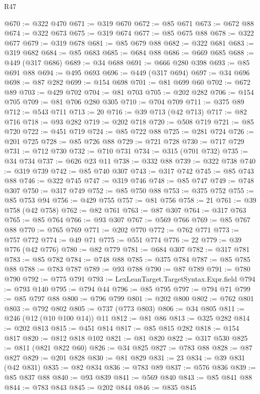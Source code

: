 \begin{lexlean}{R47}
\begin{coremodule}
@670 := @322 @470
@671 := @319 @670
@672 := @85 @671
@673 := @672 @88
@674 := @322 @673
@675 := @319 @674
@677 := @85 @675 @88
@678 := @322 @677
@679 := @319 @678
@681 := @85 @679 @88
@682 := @322 @681
@683 := @319 @682
@684 := @85 @683
@685 := @684 @88
@686 := @669 @685
@688 := @449 (@317 @686)
@689 := @34 @688
@691 := @666 @280 @398
@693 := @85 @691 @88
@694 := @495 @693
@696 := @449 (@317 @694)
@697 := @34 @696
@698 := @87 @282
@699 := @154 @698
@701 := @81 @699 @60
@702 := @672 @89
@703 := @429 @702
@704 := @81 @703
@705 := @202 @282
@706 := @154 @705
@709 := @81 @706 @280 @305
@710 := @704 @709
@711 := @375 @89
@712 := @543 @711
@713 := 20
@716 := @39 @713 (@42 @713)
@717 := @82 @716
@718 := @93 @282
@719 := @202 @718
@720 := @508 @719
@721 := @85 @720
@722 := @451 @719
@724 := @85 @722 @88
@725 := @281 @724
@726 := @201 @725
@728 := @85 @726 @88
@729 := @721 @728
@730 := @717 @729
@731 := @712 @730
@732 := @710 @731
@734 := @315 (@701 @732)
@735 := @34 @734
@737 := @626 @23 @11
@738 := @332 @88
@739 := @322 @738
@740 := @319 @739
@742 := @85 @740 @307
@743 := @317 @742
@745 := @85 @743 @88
@746 := @322 @745
@747 := @319 @746
@748 := @85 @747
@749 := @748 @307
@750 := @317 @749
@752 := @85 @750 @88
@753 := @375 @752
@755 := @85 @753 @94
@756 := @429 @755
@757 := @81 @756
@758 := 21
@761 := @39 @758 (@42 @758)
@762 := @82 @761
@763 := @87 @307
@764 := @317 @763
@765 := @85 @764
@766 := @93 @307
@767 := @569 @766
@769 := @85 @767 @88
@770 := @765 @769
@771 := @202 @770
@772 := @762 @771
@773 := @757 @772
@774 := @49 @71
@775 := @551 @774
@776 := 22
@779 := @39 @776 (@42 @776)
@780 := @82 @779
@781 := @684 @307
@782 := @317 @781
@783 := @85 @782
@784 := @748 @88
@785 := @375 @784
@787 := @85 @785 @88
@788 := @783 @787
@789 := @93 @788
@790 := @87 @789
@791 := @780 @790
@792 := @775 @791
@793 := LexLeanTarget.TargetSyntax.Expr.field
@794 := @793 @140
@795 := @794 @44
@796 := @85 @795
@797 := @794 @71
@799 := @85 @797 @88
@800 := @796 @799
@801 := @202 @800
@802 := @762 @801
@803 := @792 @802
@805 := @737 (@773 @803)
@806 := @34 @805
@811 := @246 (@12 (@10 @100 @14)) @11
@812 := @81 @86
@813 := @325 @282
@814 := @202 @813
@815 := @451 @814
@817 := @85 @815 @282
@818 := @154 @817
@820 := @812 @818 @102
@821 := @81 @820
@822 := @317 @530
@825 := @811 (@821 @822 @60)
@826 := @34 @825
@827 := @783 @88
@828 := @87 @827
@829 := @201 @828
@830 := @81 @829
@831 := 23
@834 := @39 @831 (@42 @831)
@835 := @82 @834
@836 := @783 @89
@837 := @576 @836
@839 := @85 @837 @88
@840 := @93 @839
@841 := @569 @840
@843 := @85 @841 @88
@844 := @783 @843
@845 := @202 @844
@846 := @835 @845

\end{coremodule}
\end{lexlean}

